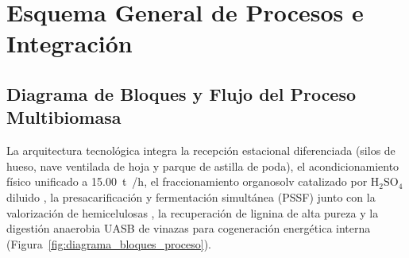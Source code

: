 \documentclass{report}
\begin{document}
\chapter{Esquema General de Procesos e Integración}

\section{Diagrama de Bloques y Flujo del Proceso Multibiomasa}
La arquitectura tecnológica integra la recepción estacional diferenciada (silos de hueso, nave ventilada de hoja y parque de astilla de poda), el acondicionamiento físico unificado a \SI{15.00}{\tonne{}/\hour}, el fraccionamiento organosolv catalizado por $\mathrm{H_2SO_4}$ diluido \autocite[Fig.~1]{Jafari-Gohargan2026, Padilla-Rascon2022}, la presacarificación y fermentación simultánea (PSSF) junto con la valorización de hemicelulosas \autocite{RomeroGarcia2022}, la recuperación de lignina de alta pureza y la digestión anaerobia UASB de vinazas para cogeneración energética interna (Figura~\ref{fig:diagrama_bloques_proceso}).
\end{document}
